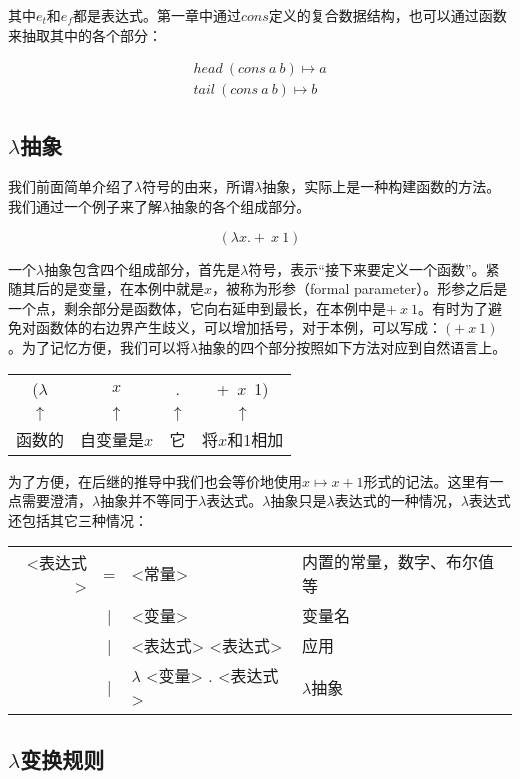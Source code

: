 \documentclass{article}
\begin{document}
其中$e_t$和$e_f$都是表达式。第一章中通过$cons$定义的复合数据结构，也可以通过函数来抽取其中的各个部分：

\[
\begin{array}{l}
head\ (cons\ a\ b) \mapsto a \\
tail\ (cons\ a\ b) \mapsto b
\end{array}
\]

\subsection{$\lambda$抽象}

我们前面简单介绍了$\lambda$符号的由来，所谓$\lambda$抽象，实际上是一种构建函数的方法。我们通过一个例子来了解$\lambda$抽象的各个组成部分。

\[
(\lambda x . +\ x\ 1)
\]

一个$\lambda$抽象包含四个组成部分，首先是$\lambda$符号，表示“接下来要定义一个函数”。紧随其后的是变量，在本例中就是$x$，被称为形参（formal parameter）。形参之后是一个点，剩余部分是函数体，它向右延申到最长，在本例中是$+\ x\ 1$。有时为了避免对函数体的右边界产生歧义，可以增加括号，对于本例，可以写成：$(+\ x\ 1)$。为了记忆方便，我们可以将$\lambda$抽象的四个部分按照如下方法对应到自然语言上。

\begin{tabular}{cccc}
($\lambda$ & $x$ & . & +\  $x$\ 1) \\
$\uparrow$ & $\uparrow$ & $\uparrow$ & $\uparrow$ \\
函数的 & 自变量是$x$ & 它 & 将$x$和1相加 \\
\end{tabular}

为了方便，在后继的推导中我们也会等价地使用$x \mapsto x + 1$形式的记法。这里有一点需要澄清，$\lambda$抽象并不等同于$\lambda$表达式。$\lambda$抽象只是$\lambda$表达式的一种情况，$\lambda$表达式还包括其它三种情况：

\begin{tabular}{rcll}
<表达式> & = & <常量> & 内置的常量，数字、布尔值等 \\
        & | & <变量> & 变量名 \\
        & | & <表达式> <表达式> & 应用 \\
        & | & $\lambda$ <变量> . <表达式> & $\lambda$抽象
\end{tabular}

\subsection{$\lambda$变换规则}
\end{document}
